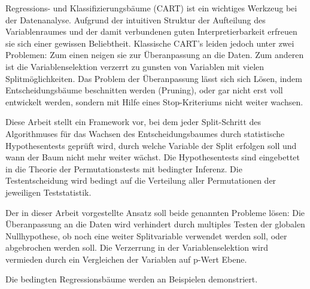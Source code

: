 Regressions- und Klassifizierungsbäume (CART) ist ein wichtiges
Werkzeug bei der Datenanalyse. Aufgrund der intuitiven Struktur der
Aufteilung des Variablenraumes und der damit verbundenen guten
Interpretierbarkeit erfreuen sie sich einer gewissen Beliebtheit.
Klassische CART's leiden jedoch unter zwei Problemen: Zum einen neigen
sie zur Überanpassung an die Daten. Zum anderen ist die
Variablenselektion verzerrt zu gunsten von Variablen mit vielen
Splitmöglichkeiten.  Das Problem der Überanpassung lässt sich sich
Lösen, indem Entscheidungsbäume beschnitten werden (Pruning), oder gar
nicht erst voll entwickelt werden, sondern mit Hilfe eines
Stop-Kriteriums nicht weiter wachsen.

Diese Arbeit stellt ein Framework vor, bei dem jeder Split-Schritt
des Algorithmuses für das Wachsen des Entscheidungsbaumes durch
statistische Hypothesentests geprüft wird, durch welche Variable der Split
erfolgen soll und wann der Baum nicht mehr weiter wächst. Die
Hypothesentests sind eingebettet in die Theorie der
Permutationstests mit bedingter Inferenz. Die Testentscheidung wird bedingt auf die
Verteilung aller Permutationen der jeweiligen Teststatistik. 

Der in dieser Arbeit vorgestellte Ansatz soll beide genannten Probleme
lösen: Die Überanpassung an die Daten wird verhindert durch multiples
Testen der globalen Nullhypothese, ob noch eine weiter Splitvariable
verwendet werden soll, oder abgebrochen werden soll. 
Die Verzerrung in der Variablenselektion wird vermieden durch ein
Vergleichen der Variablen auf p-Wert Ebene. 

Die bedingten Regressionsbäume werden an Beispielen demonstriert. 
